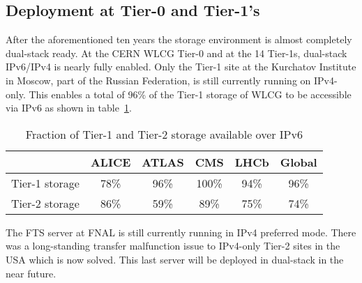 
%
\subsection{Deployment at Tier-0 and Tier-1's}
After the aforementioned ten years the storage environment is almost completely dual-stack ready. At the CERN WLCG Tier-0 and at the 14 Tier-1s, dual-stack IPv6/IPv4 is nearly fully enabled. Only the Tier-1 site at the Kurchatov Institute in Moscow, part of the Russian Federation, is still currently running on IPv4-only. This enables a total of 96\% of the Tier-1 storage of WLCG to be accessible via IPv6 as shown in table~\ref{tab:t012stor}.
\begin{table}[h]
\centering
\caption{Fraction of Tier-1 and Tier-2 storage available over IPv6}
\label{tab:t012stor}
\begin{tabular}{lccccc}
\hline
& ALICE & ATLAS & CMS & LHCb & Global \\\hline
Tier-1 storage & 78\% & 96\% & 100\% & 94\% & 96\% \\
Tier-2 storage & 86\% & 59\% &  89\% & 75\% & 74\% \\\hline
\end{tabular}
\end{table}

The FTS server at FNAL is still currently running in IPv4 preferred mode. There was a long-standing transfer malfunction issue to IPv4-only Tier-2 sites in the USA which is now solved. This last server will be deployed in dual-stack in the near future.
